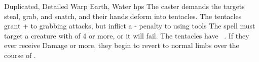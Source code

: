   {Duplicated, Detailed}%
  {Warp}%
  {Earth, Water}%
  {\glspl{hp}}%
  {The caster demands the targets steal, grab, and snatch, and their hands deform into  tentacles.
  The tentacles grant + to grabbing attacks, but inflict a - penalty to using tools}%
  {
  The spell must target a creature with  of 4 or more, or it will fail.
  The tentacles have ~.
  If they ever receive  Damage or more, they begin to revert to normal limbs over the course of .}
